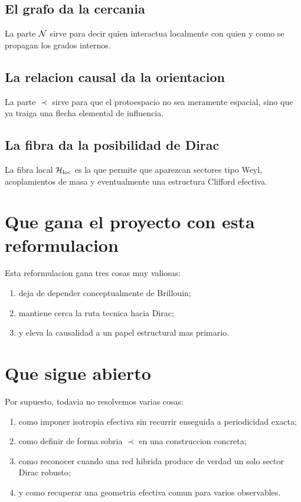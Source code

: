 \subsection{El grafo da la cercania}
La parte \(\mathcal{N}\) sirve para decir quien interactua localmente con quien y como se propagan los grados internos.

\subsection{La relacion causal da la orientacion}
La parte \(\prec\) sirve para que el protoespacio no sea meramente espacial, sino que ya traiga una flecha elemental de influencia.

\subsection{La fibra da la posibilidad de Dirac}
La fibra local \(\mathcal{H}_{\mathrm{loc}}\) es la que permite que aparezcan sectores tipo Weyl, acoplamientos de masa y eventualmente una estructura Clifford efectiva.

\section{Que gana el proyecto con esta reformulacion}
Esta reformulacion gana tres cosas muy valiosas:
\begin{enumerate}[label=\arabic*.]
    \item deja de depender conceptualmente de Brillouin;
    \item mantiene cerca la ruta tecnica hacia Dirac;
    \item y eleva la causalidad a un papel estructural mas primario.
\end{enumerate}

\section{Que sigue abierto}
Por supuesto, todavia no resolvemos varias cosas:
\begin{enumerate}[label=\arabic*.]
    \item como imponer isotropia efectiva sin recurrir enseguida a periodicidad exacta;
    \item como definir de forma sobria \(\prec\) en una construccion concreta;
    \item como reconocer cuando una red hibrida produce de verdad un solo sector Dirac robusto;
    \item y como recuperar una geometria efectiva comun para varios observables.
\end{enumerate}

